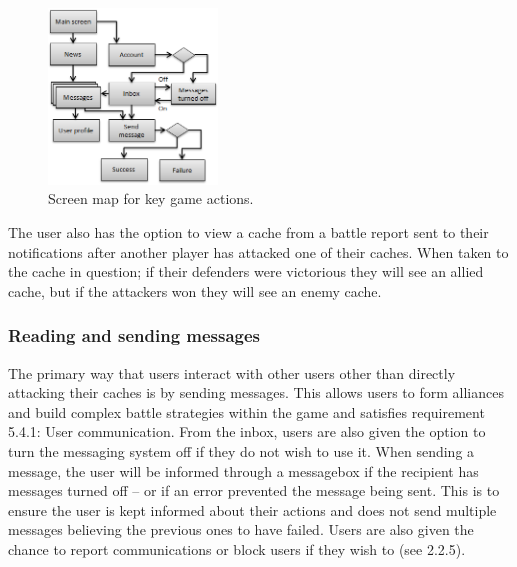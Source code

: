 \begin{figure}
	\vspace{-20pt}
	\begin{center}
	\includegraphics[width=0.4\textwidth]{images/sending_messages}
	\caption{Screen map for key game actions.}
	\label{sending_messages}
	\end{center}
\end{figure}

The user also has the option to view a cache from a battle report sent to their notifications after another player has attacked one of their caches. When taken to the cache in question; if their defenders were victorious they will see an allied cache, but if the attackers won they will see an enemy cache.

\subsubsection{Reading and sending messages}
The primary way that users interact with other users other than directly attacking their caches is by sending messages. This allows users to form alliances and build complex battle strategies within the game and satisfies requirement 5.4.1: User communication. From the inbox, users are also given the option to turn the messaging system off if they do not wish to use it. When sending a message, the user will be informed through a messagebox if the recipient has messages turned off – or if an error prevented the message being sent. This is to ensure the user is kept informed about their actions and does not send multiple messages believing the previous ones to have failed. Users are also given the chance to report communications or block users if they wish to (see 2.2.5).

